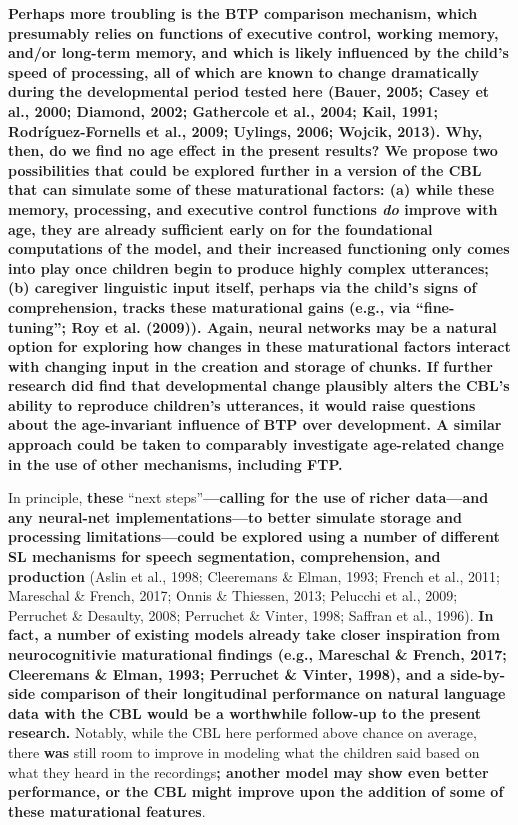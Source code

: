 \documentclass[
  english,
  man,mask,floatsintext]{apa6}
\begin{document}
\textbf{Perhaps more troubling is the BTP comparison mechanism, which presumably relies on functions of executive control, working memory, and/or long-term memory, and which is likely influenced by the child's speed of processing, all of which are known to change dramatically during the developmental period tested here (Bauer, 2005; Casey et al., 2000; Diamond, 2002; Gathercole et al., 2004; Kail, 1991; Rodríguez-Fornells et al., 2009; Uylings, 2006; Wojcik, 2013). Why, then, do we find no age effect in the present results? We propose two possibilities that could be explored further in a version of the CBL that can simulate some of these maturational factors: (a) while these memory, processing, and executive control functions \emph{do} improve with age, they are already sufficient early on for the foundational computations of the model, and their increased functioning only comes into play once children begin to produce highly complex utterances; (b) caregiver linguistic input itself, perhaps via the child's signs of comprehension, tracks these maturational gains (e.g., via \enquote{fine-tuning}; Roy et al. (2009)). Again, neural networks may be a natural option for exploring how changes in these maturational factors interact with changing input in the creation and storage of chunks. If further research did find that developmental change plausibly alters the CBL's ability to reproduce children's utterances, it would raise questions about the age-invariant influence of BTP over development. A similar approach could be taken to comparably investigate age-related change in the use of other mechanisms, including FTP.}

In principle, \textbf{these} \enquote{next steps}\textbf{---calling for the use of richer data---and any neural-net implementations---to better simulate storage and processing limitations---could be explored using a number of different SL mechanisms for speech segmentation, comprehension, and production} (Aslin et al., 1998; Cleeremans \& Elman, 1993; French et al., 2011; Mareschal \& French, 2017; Onnis \& Thiessen, 2013; Pelucchi et al., 2009; Perruchet \& Desaulty, 2008; Perruchet \& Vinter, 1998; Saffran et al., 1996). \textbf{In fact, a number of existing models already take closer inspiration from neurocognitivie maturational findings (e.g., Mareschal \& French, 2017; Cleeremans \& Elman, 1993; Perruchet \& Vinter, 1998), and a side-by-side comparison of their longitudinal performance on natural language data with the CBL would be a worthwhile follow-up to the present research.} Notably, while the CBL here performed above chance on average, there \textbf{was} still room to improve in modeling what the children said based on what they heard in the recordings\textbf{; another model may show even better performance, or the CBL might improve upon the addition of some of these maturational features}.
\end{document}
